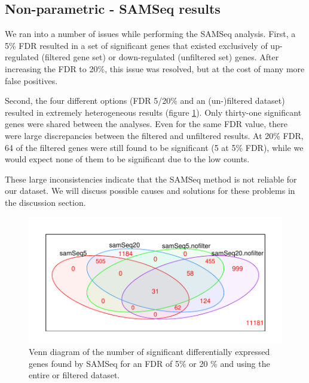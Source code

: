\documentclass[a4paper,10pt]{article}\usepackage[]{graphicx}\usepackage[]{color}
\makeatletter
\def\maxwidth{ %
  \ifdim\Gin@nat@width>\linewidth
    \linewidth
  \else
    \Gin@nat@width
  \fi
}
\newenvironment{knitrout}{}{} %
\makeatother
\begin{document}
\subsection{Non-parametric - SAMSeq results}


We ran into a number of issues while performing the SAMSeq analysis. First, a 5\% FDR resulted in a set of significant genes that existed exclusively of up-regulated (filtered gene set) or down-regulated (unfiltered set) genes. After increasing the FDR to 20\%, this issue was resolved, but at the cost of many more false positives. 

Second, the four different options (FDR 5/20\% and an (un-)filtered dataset) resulted in extremely heterogeneous results (figure \ref{samseq-filterplot}). Only thirty-one significant genes were shared between the analyses. Even for the same FDR value, there were large discrepancies between the filtered and unfiltered results. At 20\% FDR, 64 of the filtered genes were still found to be significant (5 at 5\% FDR), while we would expect none of them to be significant due to the low counts. 

These large inconsistencies indicate that the SAMSeq method is not reliable for our dataset. We will discuss possible causes and solutions for these problems in the discussion section.

\begin{figure}[H]
\centering
\begin{knitrout}
\color{fgcolor}

{\centering \includegraphics[width=\maxwidth]{figures/plots-samseq-plot-filter-1} 

}



\end{knitrout}
\caption{Venn diagram of the number of significant differentially expressed genes found by SAMSeq for an FDR of 5\% or 20 \% and using the entire or filtered dataset.}
\label{samseq-filterplot}
\end{figure}
\end{document}
